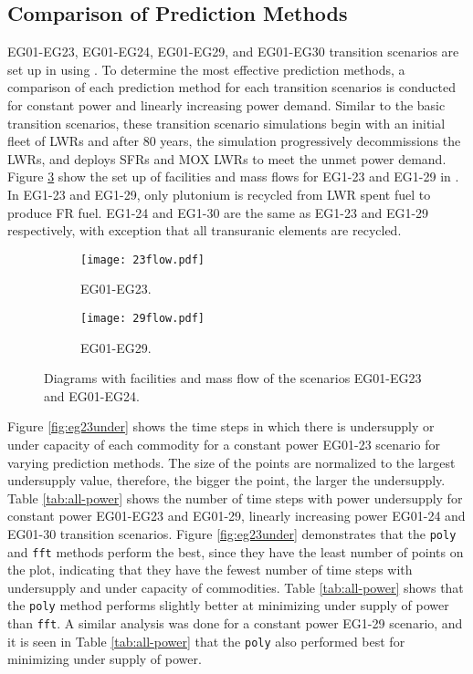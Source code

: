 \subsection{Comparison of Prediction Methods}

EG01-EG23, EG01-EG24, EG01-EG29, and EG01-EG30 transition scenarios
are set up in \Cyclus using \deploy. 
To determine the most effective \deploy prediction methods, a
comparison of each prediction method for each 
transition scenarios is conducted for constant power 
and linearly increasing power demand. 
Similar to the basic transition scenarios, these transition scenario 
simulations begin with an initial fleet of \glspl{LWR} and after 
80 years, the simulation progressively decommissions the \glspl{LWR}, 
and \deploy deploys \glspl{SFR} and \gls{MOX} \glspl{LWR} to meet 
the unmet power demand. 
Figure \ref{fig:eg2329}
show the set up of facilities and mass flows for 
EG1-23 and EG1-29 in \Cyclus. 
In EG1-23 and EG1-29, only plutonium is recycled from \gls{LWR}
spent fuel to produce \gls{FR} fuel. 
EG1-24 and EG1-30 are the same as EG1-23 and EG1-29 respectively,
with exception that all transuranic elements are recycled.  

\begin{figure}[]
	\centering
	\begin{subfigure}[t]{\textwidth}
		\centering
		\texttt{[image: 23flow.pdf]} 
		\caption{EG01-EG23.}
		\label{fig:23flow}
	\end{subfigure}
	\vspace{1cm}
	\begin{subfigure}[t]{\textwidth}
		\centering
		\texttt{[image: 29flow.pdf]} 
		\caption{EG01-EG29.}
		\label{fig:29flow}
	\end{subfigure}
	\hfill
	\caption{Diagrams with facilities and mass flow of the scenarios EG01-EG23 and EG01-EG24.}
	\label{fig:eg2329}
\end{figure}

Figure \ref{fig:eg23under} shows the time steps in which there is undersupply 
or under capacity of each commodity for a constant power EG01-23 scenario for 
varying prediction methods.
The size of the points are normalized to the largest undersupply
value, therefore, the bigger the point, the larger the undersupply. 
Table \ref{tab:all-power} shows the number of time steps with power 
undersupply for constant power EG01-EG23 and EG01-29, 
linearly increasing power EG01-24 and EG01-30 transition scenarios. 
Figure \ref{fig:eg23under} demonstrates that the \texttt{poly} and 
\texttt{fft} methods perform the best, since they have the least number 
of points on the plot, indicating that they have the fewest number of time 
steps with undersupply and under capacity of commodities. 
Table \ref{tab:all-power} shows that the \texttt{poly} method performs slightly 
better at minimizing under supply of power than \texttt{fft}.
A similar analysis was done for a constant power EG1-29 scenario, and 
it is seen in Table \ref{tab:all-power} that the \texttt{poly} also performed 
best for minimizing under supply of power.  


